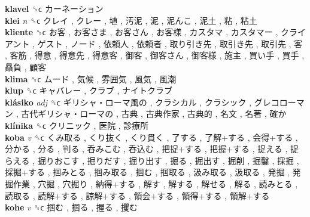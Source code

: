 \textbf{klavel} ␝ϲ   カーネーション   \\
\textbf{klei} \emph{n}  ␝ϲ   クレイ ,  クレー ,  埴 ,  汚泥 ,  泥 ,  泥んこ ,  泥土 ,  粘 ,  粘土   \\
\textbf{kliente} ␝ϲ   お客 ,  お客さま ,  お客さん ,  お客様 ,  カスタマ ,  カスタマー ,  クライアント ,  ゲスト ,  ノード ,  依頼人 ,  依頼者 ,  取り引き先 ,  取引き先 ,  取引先 ,  客 ,  客筋 ,  得意 ,  得意先 ,  得意客 ,  御客 ,  御客さん ,  御客様 ,  施主 ,  買い手 ,  買手 ,  贔負 ,  顧客   \\
\textbf{klima} ␝ϲ   ムード ,  気候 ,  雰囲気 ,  風気 ,  風潮   \\
\textbf{klup} ␝ϲ   キャバレー ,  クラブ ,  ナイトクラブ   \\
\textbf{klásiko} \emph{adj}  ␝ϲ   ギリシャ・ローマ風の ,  クラシカル ,  クラシック ,  グレコローマン ,  古代ギリシャ・ローマの ,  古典 ,  古典作家 ,  古典的 ,  名文 ,  名著 ,  確か   \\
\textbf{klínika} ␝ϲ   クリニック ,  医院 ,  診療所   \\
\textbf{koba} \emph{v}  ␝ϲ   くみ取る ,  くり抜く ,  くり貫く ,  了する ,  了解+する ,  会得+する ,  分かる ,  分る ,  判る ,  呑みこむ ,  呑込む ,  把捉+する ,  把握+する ,  捉える ,  捉らえる ,  掘りおこす ,  掘りだす ,  掘り出す ,  掘る ,  掘出す ,  掘削 ,  掘鑿 ,  採掘 ,  採掘+する ,  掴みとる ,  掴み取る ,  掴む ,  掴取る ,  汲み取る ,  汲取る ,  発掘 ,  発掘作業 ,  穴掘 ,  穴掘り ,  納得+する ,  解す ,  解する ,  解せる ,  解る ,  読みとる ,  読取る ,  読解+する ,  諒解+する ,  領会+する ,  領得+する ,  領解+する   \\
\textbf{kohe} \emph{v}  ␝ϲ   掴む ,  掴る ,  握る ,  攫む   \\
